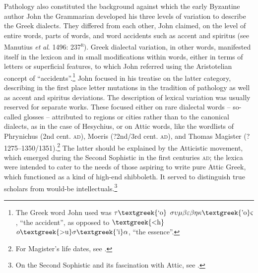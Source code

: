 \documentclass[output=paper]{langsci/langscibook}
\begin{document}
\begin{styleCatalogusnotities}
Pathology also constituted the background against which the early Byzantine author John the Grammarian developed his three levels of variation to describe the Greek dialects. They differed from each other, John claimed, on the level of entire words, parts of words, and word accidents such as accent and spiritus (see Manutius \textit{et} \textit{al}. 1496: 237\textsc{\textsuperscript{r}}). Greek dialectal variation, in other words, manifested itself in the lexicon and in small modifications within words, either in terms of letters or superficial features, to which John referred using the Aristotelian concept of “accidents”.\footnote{The Greek word John used was $\tau \text{\textgreek{`o}}$ $\sigma \upsilon \mu \beta \varepsilon \beta \eta \kappa \text{\textgreek{'o}}\varsigma $, “the accident”, as opposed to $\text{\textgreek{<h}}$ $o\text{\textgreek{>u}}\sigma \text{\textgreek{'i}}\alpha $, “the essence”.} John focused in his treatise on the latter category, describing in the first place letter mutations in the tradition of pathology as well as accent and spiritus deviations. The description of lexical variation was usually reserved for separate works. These focused either on rare dialectal words – so-called glosses – attributed to regions or cities rather than to the canonical dialects, as in the case of Hesychius, or on Attic words, like the wordlists of Phrynichus (2nd cent. \textsc{ad}), Moeris (?2nd/3rd cent. \textsc{ad}), and Thomas Magister (?1275–1350/1351).\footnote{ \textrm{For Magister’s life dates, see \citet[417]{Baloglou1998}.}} The latter should be explained by the Atticistic movement, which emerged during the Second Sophistic in the first centuries \textsc{ad}; the lexica were intended to cater to the needs of those aspiring to write pure Attic Greek, which functioned as a kind of high-end shibboleth. It served to distinguish true scholars from would-be intellectuals.\footnote{On the Second Sophistic and its fascination with Attic, see \citet{Whitmarsh2005}.}
\end{styleCatalogusnotities}
\end{document}
